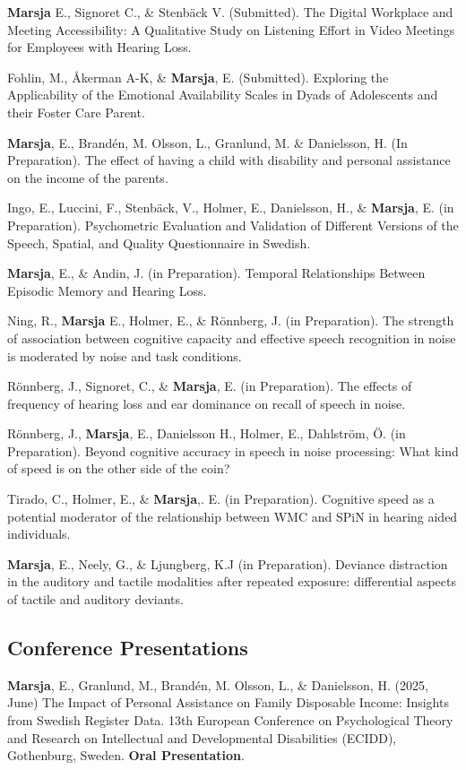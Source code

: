 \documentclass[]{article}
\begin{document}
\textbf{Marsja} E., Signoret C., \& Stenbäck V. (Submitted). The Digital
Workplace and Meeting Accessibility: A Qualitative Study on Listening
Effort in Video Meetings for Employees with Hearing Loss.

Fohlin, M., Åkerman A-K, \& \textbf{Marsja}, E. (Submitted). Exploring
the Applicability of the Emotional Availability Scales in Dyads of
Adolescents and their Foster Care Parent.

\textbf{Marsja}, E., Brandén, M. Olsson, L., Granlund, M. \& Danielsson,
H. (In Preparation). The effect of having a child with disability and
personal assistance on the income of the parents.

Ingo, E., Luccini, F., Stenbäck, V., Holmer, E., Danielsson, H., \&
\textbf{Marsja}, E. (in Preparation). Psychometric Evaluation and
Validation of Different Versions of the Speech, Spatial, and Quality
Questionnaire in Swedish.

\textbf{Marsja}, E., \& Andin, J. (in Preparation). Temporal
Relationships Between Episodic Memory and Hearing Loss.

Ning, R., \textbf{Marsja} E., Holmer, E., \& Rönnberg, J. (in
Preparation). The strength of association between cognitive capacity and
effective speech recognition in noise is moderated by noise and task
conditions.

Rönnberg, J., Signoret, C., \& \textbf{Marsja}, E. (in Preparation). The
effects of frequency of hearing loss and ear dominance on recall of
speech in noise.

Rönnberg, J., \textbf{Marsja}, E., Danielsson H., Holmer, E., Dahlström,
Ö. (in Preparation). Beyond cognitive accuracy in speech in noise
processing: What kind of speed is on the other side of the coin?

Tirado, C., Holmer, E., \& \textbf{Marsja},. E. (in Preparation).
Cognitive speed as a potential moderator of the relationship between WMC
and SPiN in hearing aided individuals.

\textbf{Marsja}, E., Neely, G., \& Ljungberg, K.J (in Preparation).
Deviance distraction in the auditory and tactile modalities after
repeated exposure: differential aspects of tactile and auditory
deviants.

\subsection{Conference Presentations}\label{conference-presentations}

\textbf{Marsja}, E., Granlund, M., Brandén, M. Olsson, L., \&
Danielsson, H. (2025, June) The Impact of Personal Assistance on Family
Disposable Income: Insights from Swedish Register Data. 13th European
Conference on Psychological Theory and Research on Intellectual and
Developmental Disabilities (ECIDD), Gothenburg, Sweden. \textbf{Oral
Presentation}.
\end{document}
